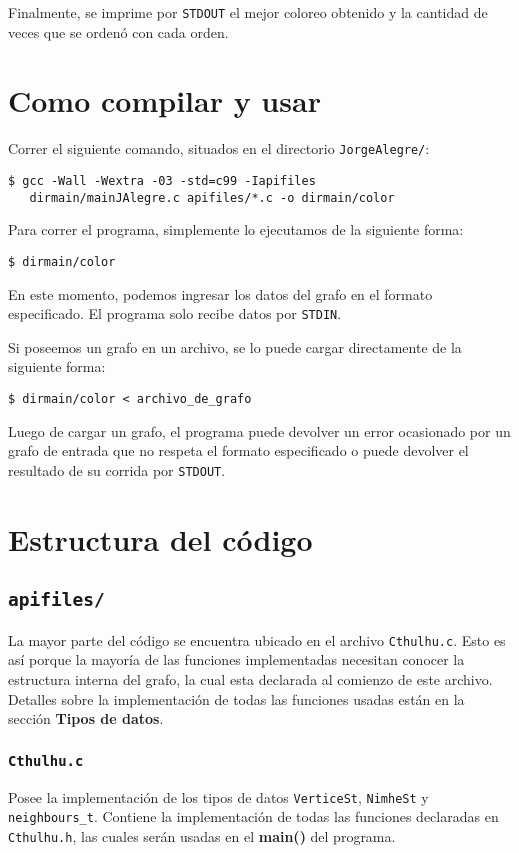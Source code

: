\documentclass[11pt]{article}   	%
\begin{document}
Finalmente, se imprime por \texttt{STDOUT} el mejor coloreo obtenido y la cantidad de veces que se ordenó
con cada orden.
\clearpage

\section{Como compilar y usar}
Correr el siguiente comando, situados en el directorio \texttt{JorgeAlegre/}:
\lstset{style=custombash}
\begin{lstlisting}
$ gcc -Wall -Wextra -03 -std=c99 -Iapifiles 
   dirmain/mainJAlegre.c apifiles/*.c -o dirmain/color
\end{lstlisting}

Para correr el programa, simplemente lo ejecutamos de la siguiente forma:
\begin{lstlisting}
$ dirmain/color
\end{lstlisting}
En este momento, podemos ingresar los datos del grafo en el formato especificado. El programa
solo recibe datos por \texttt{STDIN}.

Si poseemos un grafo en un archivo, se lo puede cargar directamente de la siguiente forma:
\begin{lstlisting}
$ dirmain/color < archivo_de_grafo
\end{lstlisting}

Luego de cargar un grafo, el programa puede devolver un error ocasionado por un grafo de entrada
que no respeta el formato especificado o puede devolver el resultado de su corrida por \texttt{STDOUT}.
\clearpage

\section{Estructura del código}
\subsection{\texttt{apifiles/}}
La mayor parte del código se encuentra ubicado en el archivo \texttt{Cthulhu.c}. Esto es así porque
la mayoría de las funciones implementadas necesitan conocer la estructura interna del grafo, la cual esta
declarada al comienzo de este archivo. Detalles sobre la implementación de todas las funciones usadas
están en la sección \textbf{Tipos de datos}.

\subsubsection{\texttt{Cthulhu.c}}
Posee la implementación de los tipos de datos \texttt{VerticeSt}, \texttt{NimheSt} y \texttt{neighbours\_t}.
Contiene la implementación de todas las funciones declaradas en \texttt{Cthulhu.h}, las cuales serán usadas
en el \textbf{main()} del programa.
\end{document}
